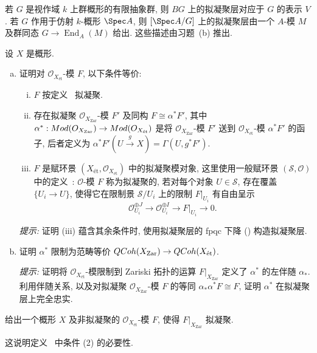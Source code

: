 \begin{example}\label{src:5.1.21}
若 $G$ 是视作域 $k$ 上群概形的有限抽象群, 则 $BG$ 上的拟凝聚层对应于 $G$ 的表示 $V$. 若 $G$ 作用于仿射 $k$-概形 $\Spec A$, 则 $[\Spec A/G]$ 上的拟凝聚层由一个 $A$-模 $M$ 及群同态 $G\to\operatorname{End}_A(M)$ 给出. 这些描述由习题~(b) 推出.
\end{example}
\begin{exercise}[等价性 I]\label{src:5.1.22}
设 $X$ 是概形.
\begin{enumerate}[(a)]
\item 证明对 $\mathcal O_{X_{\text{ét}}}$-模 $F$, 以下条件等价:
\begin{enumerate}[(i)]
\item $F$ 按定义~ 拟凝聚.
\item 存在拟凝聚 $\mathcal O_{X_{\mathrm{Zar}}}$-模 $F'$ 及同构 $F\cong\alpha^*F'$, 其中 $\alpha^*:Mod(O_{X_{\mathrm{Zar}}})\to Mod(O_{X_{\text{ét}}})$ 是将 $\mathcal O_{X_{\mathrm{Zar}}}$-模 $F'$ 送到 $\mathcal O_{X_{\text{ét}}}$-模 $\alpha^*F'$ 的函子, 后者定义为 $\alpha^*F'(U\xrightarrow{g}X)=\Gamma(U,g^*F')$.
\item $F$ 是赋环景 $(X_{\text{ét}},\mathcal O_{X_{\text{ét}}})$ 中的拟凝聚模对象, 这里使用一般赋环景 $(\mathcal S,\mathcal O)$ 中的定义~\cite[Tag 03DL]{SP}: $\mathcal O$-模 $F$ 称为拟凝聚的, 若对每个对象 $U\in\mathcal S$, 存在覆盖 $\{U_i\to U\}$, 使得它在限制景 $\mathcal S/U_i$ 上的限制 $F|_{U_i}$ 有自由呈示
\[
\mathcal O_{U_i}^{\oplus J}\longrightarrow\mathcal O_{U_i}^{\oplus I}\longrightarrow F|_{U_i}\longrightarrow0.
\]
\end{enumerate}
\textit{提示:} 证明 (iii) 蕴含其余条件时, 使用拟凝聚层的 fpqc 下降 () 构造拟凝聚层.
\item 证明 $\alpha^*$ 限制为范畴等价 $QCoh(X_{\mathrm{Zar}})\to QCoh(X_{\text{ét}})$.

\textit{提示:} 证明将 $\mathcal O_{X_{\text{ét}}}$-模限制到 Zariski 拓扑的运算 $F|_{X_{\mathrm{Zar}}}$ 定义了 $\alpha^*$ 的左伴随 $\alpha_*$. 利用伴随关系, 以及对拟凝聚 $\mathcal O_{X_{\mathrm{Zar}}}$-模 $F$ 的等同 $\alpha_*\alpha^*F\cong F$, 证明 $\alpha^*$ 在拟凝聚层上完全忠实.
\end{enumerate}
\end{exercise}
\begin{exercise}\label{src:5.1.23}
给出一个概形 $X$ 及非拟凝聚的 $\mathcal O_{X_{\text{ét}}}$-模 $F$, 使得 $F|_{X_{\mathrm{Zar}}}$ 拟凝聚.
\end{exercise}
这说明定义~ 中条件 (2) 的必要性.
